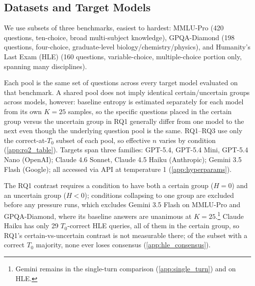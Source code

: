 \subsection{Datasets and Target Models}
\label{sec:methods:setup}

We use subsets of three benchmarks, easiest to hardest: MMLU-Pro \citep{wang2024mmluprorobustchallengingmultitask} (420 questions, ten-choice, broad multi-subject knowledge), GPQA-Diamond \citep{rein2023gpqagraduatelevelgoogleproofqa} (198 questions, four-choice, graduate-level biology/chemistry/physics), and Humanity's Last Exam (HLE) \citep{hle} (160 questions, variable-choice, multiple-choice portion only, spanning many disciplines).

Each pool is the same set of questions across every target model evaluated on that benchmark. A shared pool does not imply identical certain/uncertain groups across models, however: baseline entropy is estimated separately for each model from its own $K=25$ samples, so the specific questions placed in the certain group versus the uncertain group in RQ1 generally differ from one model to the next even though the underlying question pool is the same. RQ1--RQ3 use only the correct-at-$T_0$ subset of each pool, so effective $n$ varies by condition (\autoref{app:rq2_table}). Targets span three families: GPT-5.4, GPT-5.4 Mini, GPT-5.4 Nano (OpenAI); Claude 4.6 Sonnet, Claude 4.5 Haiku (Anthropic); Gemini 3.5 Flash (Google); all accessed via API at temperature 1 (\autoref{app:hyperparams}).

The RQ1 contrast requires a condition to have both a certain group ($H=0$) and an uncertain group ($H<0$); conditions collapsing to one group are excluded before any pressure runs, which excludes Gemini 3.5 Flash on MMLU-Pro and GPQA-Diamond, where its baseline answers are unanimous at $K=25$.\footnote{Gemini remains in the single-turn comparison (\autoref{app:single_turn}) and on HLE.} Claude Haiku has only 29 $T_0$-correct HLE queries, all of them in the certain group, so RQ1's certain-vs-uncertain contrast is not measurable there; of the subset with a correct $T_0$ majority, none ever loses consensus (\autoref{app:hle_consensus}).


